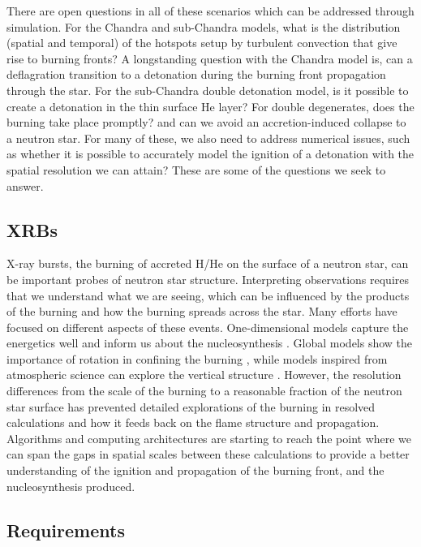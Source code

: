 \documentclass[a4paper]{jpconf}
\begin{document}
There are open questions in all of these scenarios which can be
addressed through simulation.  For the Chandra and sub-Chandra models,
what is the distribution (spatial and temporal) of the hotspots setup
by turbulent convection that give rise to burning fronts?  A
longstanding question with the Chandra model is, can a deflagration
transition to a detonation during the burning front propagation
through the star.  For the sub-Chandra double detonation model, is it
possible to create a detonation in the thin surface He layer?  For
double degenerates, does the burning take place promptly? and can we
avoid an accretion-induced collapse to a neutron star.  For many of
these, we also need to address numerical issues, such as whether it is
possible to accurately model the ignition of a detonation with the
spatial resolution we can attain?  These are some of the questions we
seek to answer.

\subsection{XRBs}

X-ray bursts, the burning of accreted H/He on the surface of a neutron
star, can be important probes of neutron star structure.  Interpreting
observations requires that we understand what we are seeing, which can
be influenced by the products of the burning and how the burning
spreads across the star.  Many efforts have focused on different
aspects of these events.  One-dimensional models capture the
energetics well and inform us about the nucleosynthesis
\cite{woosley-xrb}.  Global models show the importance of rotation in
confining the burning \cite{SPIT_ETAL02}, while models inspired from
atmospheric science can explore the vertical structure
\cite{cavecchi:2012}.  However, the resolution differences from the
scale of the burning to a reasonable fraction of the neutron star
surface has prevented detailed explorations of the burning in resolved
calculations and how it feeds back on the flame structure and
propagation.  Algorithms and computing architectures are starting to
reach the point where we can span the gaps in spatial scales between
these calculations to provide a better understanding of the ignition
and propagation of the burning front, and the nucleosynthesis produced.


\subsection{Requirements}
\end{document}
